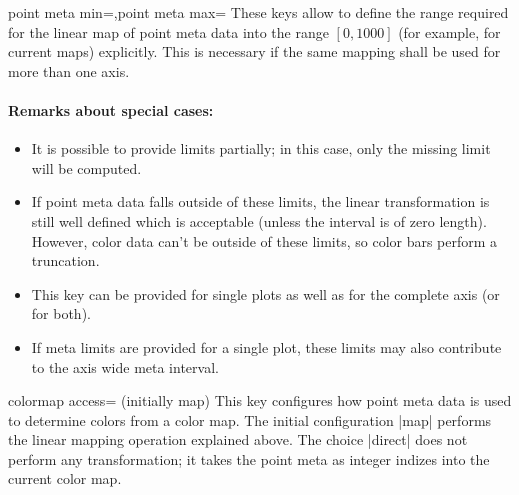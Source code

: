 \begin{pgfplotskeylist}{point meta min=,point meta max=}
	These keys allow to define the range required for the linear map of point meta data into the range $[0,1000]$ (for example, for current maps) explicitly. This is necessary if the same mapping shall be used for more than one axis.

	\paragraph{Remarks about special cases:}
	\begin{itemize}
		\item It is possible to provide limits partially; in this case, only the missing limit will be computed.
		\item If point meta data falls outside of these limits, the linear transformation is still well defined which is acceptable (unless the interval is of zero length). However, color data can't be outside of these limits, so color bars perform a truncation.
		\item This key can be provided for single plots as well as for the complete axis (or for both).
		\item If meta limits are provided for a single plot, these limits may also contribute to the axis wide meta interval.
	\end{itemize}
\end{pgfplotskeylist}

\begin{pgfplotskey}{colormap access= (initially map)}
	This key configures how point meta data is used to determine colors from a color map. The initial configuration |map| performs the linear mapping operation explained above. The choice |direct| does not perform any transformation; it takes the point meta as integer indizes into the current color map. 
\end{pgfplotskey}

